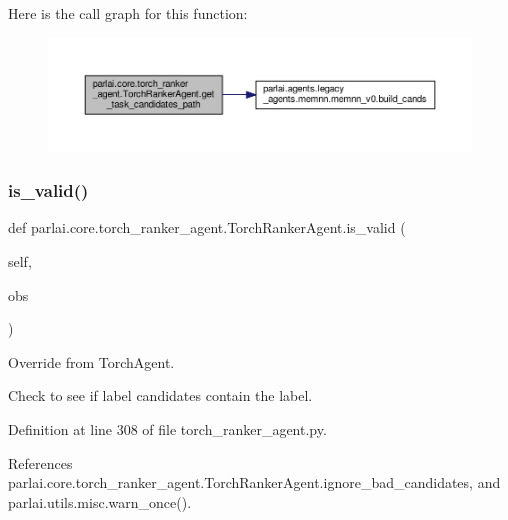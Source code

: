 Here is the call graph for this function\+:
\nopagebreak
\begin{figure}[H]
\begin{center}
\leavevmode
\includegraphics[width=350pt]{classparlai_1_1core_1_1torch__ranker__agent_1_1TorchRankerAgent_a936cebe646816609dd1d4f56b9490d45_cgraph}
\end{center}
\end{figure}
\mbox{\label{classparlai_1_1core_1_1torch__ranker__agent_1_1TorchRankerAgent_a3a80c3eb68b019859da2a83706c3844d}} 
\subsubsection{\texorpdfstring{is\+\_\+valid()}{is\_valid()}}
{\footnotesize\ttfamily def parlai.\+core.\+torch\+\_\+ranker\+\_\+agent.\+Torch\+Ranker\+Agent.\+is\+\_\+valid (\begin{DoxyParamCaption}\item[{}]{self,  }\item[{}]{obs }\end{DoxyParamCaption})}

\begin{DoxyVerb}Override from TorchAgent.

Check to see if label candidates contain the label.
\end{DoxyVerb}
 

Definition at line 308 of file torch\+\_\+ranker\+\_\+agent.\+py.



References parlai.\+core.\+torch\+\_\+ranker\+\_\+agent.\+Torch\+Ranker\+Agent.\+ignore\+\_\+bad\+\_\+candidates, and parlai.\+utils.\+misc.\+warn\+\_\+once().

